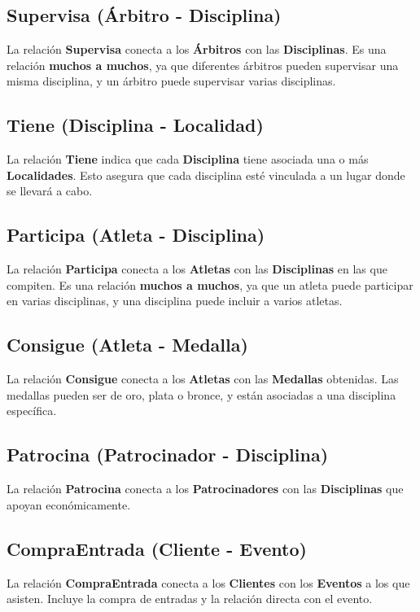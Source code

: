 \subsection*{Supervisa (Árbitro - Disciplina)}
La relación \textbf{Supervisa} conecta a los \textbf{Árbitros} con las \textbf{Disciplinas}. Es una relación \textbf{muchos a muchos}, ya que diferentes árbitros pueden supervisar una misma disciplina, y un árbitro puede supervisar varias disciplinas.

\subsection*{Tiene (Disciplina - Localidad)}
La relación \textbf{Tiene} indica que cada \textbf{Disciplina} tiene asociada una o más \textbf{Localidades}. Esto asegura que cada disciplina esté vinculada a un lugar donde se llevará a cabo.

\subsection*{Participa (Atleta - Disciplina)}
La relación \textbf{Participa} conecta a los \textbf{Atletas} con las \textbf{Disciplinas} en las que compiten. Es una relación \textbf{muchos a muchos}, ya que un atleta puede participar en varias disciplinas, y una disciplina puede incluir a varios atletas.

\subsection*{Consigue (Atleta - Medalla)}
La relación \textbf{Consigue} conecta a los \textbf{Atletas} con las \textbf{Medallas} obtenidas. Las medallas pueden ser de oro, plata o bronce, y están asociadas a una disciplina específica.

\subsection*{Patrocina (Patrocinador - Disciplina)}
La relación \textbf{Patrocina} conecta a los \textbf{Patrocinadores} con las \textbf{Disciplinas} que apoyan económicamente.

\subsection*{CompraEntrada (Cliente - Evento)}
La relación \textbf{CompraEntrada} conecta a los \textbf{Clientes} con los \textbf{Eventos} a los que asisten. Incluye la compra de entradas y la relación directa con el evento.

